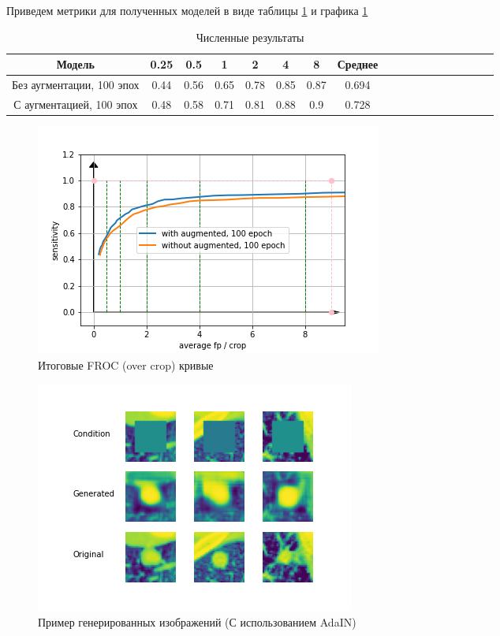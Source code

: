 Приведем метрики для полученных моделей в виде таблицы \ref{tab:result-metrics} и графика \ref{image:final-results}


\begin{table}[!h]
\caption{Численные результаты}\label{tab:result-metrics}
\centering
\begin{tabular}{|*{18}{c|}}\hline
\textbf{Модель} & \textbf{0.25} & \textbf{0.5} & \textbf{1} & \textbf{2} & \textbf{4} & \textbf{8} & \textbf{Среднее} \\\hline
Без аугментации, 100 эпох & 0.44 & 0.56 & 0.65 & 0.78 & 0.85 & 0.87 & 0.694 \\\hline
С аугментацией, 100 эпох & 0.48 & 0.58 & 0.71 & 0.81 & 0.88 & 0.9 & 0.728 \\\hline
\end{tabular}
\end{table}

\begin{figure}[!h]
\includegraphics[width=\linewidth]{images/result_plot.png}
\caption{Итоговые FROC (over crop) кривые}\label{image:final-results}
\centering
\end{figure}


\begin{figure}[!h]
\includegraphics[width=\linewidth]{images/gan-results/adain.png}
\caption{Пример генерированных изображений (С использованием AdaIN)}\label{cgan-adain-results}
\centering
\end{figure}

